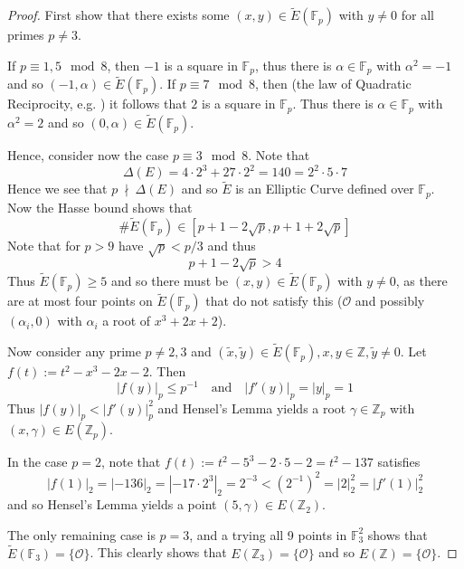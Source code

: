 \documentclass{scrartcl}
\newcommand{\Z}{\mathbb{Z}}
\newcommand{\F}{\mathbb{F}}
\renewcommand{\O}{\mathcal{O}}
\newcommand{\notdivides}{\ \nmid \ }
\theoremstyle{definition}
\begin{document}
\begin{proof}
    First show that there exists some $(x, y) \in \tilde{E}(\F_p)$ with $y \neq 0$ for all primes $p \neq 3$.

    If $p \equiv 1, 5 \mod 8$, then $-1$ is a square in $\F_p$, thus there is $\alpha \in \F_p$ with $\alpha^2 = -1$ and so $(-1, \alpha) \in \tilde{E}(\F_p)$.
    If $p \equiv 7 \mod 8$, then (the law of Quadratic Reciprocity, e.g. \cite[Prop. I.8.6]{neukirch}) it follows that $2$ is a square in $\F_p$.
    Thus there is $\alpha \in \F_p$ with $\alpha^2 = 2$ and so $(0, \alpha) \in \tilde{E}(\F_p)$.

    Hence, consider now the case $p \equiv 3 \mod 8$.
    Note that
    \begin{equation*}
        \Delta(E) = 4 \cdot 2^3 + 27 \cdot 2^2 = 140 = 2^2 \cdot 5 \cdot 7
    \end{equation*}
    Hence we see that $p \notdivides \Delta(E)$ and so $\tilde{E}$ is an Elliptic Curve defined over $\F_p$.
    Now the Hasse bound \cite[Thm 1.15]{lecture} shows that
    \begin{equation*}
        \#\tilde{E}(\F_p) \in [p + 1 - 2\sqrt{p}, p + 1 + 2\sqrt{p}]
    \end{equation*}
    Note that for $p > 9$ have $\sqrt{p} < p/3$ and thus
    \begin{equation*}
        p + 1 - 2\sqrt{p} > 4
    \end{equation*}
    Thus $\tilde{E}(\F_p) \geq 5$ and so there must be $(x, y) \in \tilde{E}(\F_p)$ with $y \neq 0$, as there are at most four points on $\tilde{E}(\F_p)$ that do not satisfy this ($\O$ and possibly $(\alpha_i, 0)$ with $\alpha_i$ a root of $x^3 + 2x + 2$).

    Now consider any prime $p \neq 2, 3$ and $(\tilde{x}, \tilde{y}) \in \tilde{E}(\F_p), x, y \in \Z, \tilde{y} \neq 0$.
    Let $f(t) := t^2 - x^3 - 2x - 2$.
    Then
    \begin{equation*}
        |f(y)|_p \leq p^{-1} \quad \text{and} \quad |f'(y)|_p = |y|_p = 1
    \end{equation*}
    Thus $|f(y)|_p < |f'(y)|_p^2$ and Hensel's Lemma yields a root $\gamma \in \Z_p$ with $(x, \gamma) \in E(\Z_p)$.

    In the case $p = 2$, note that $f(t) := t^2 - 5^3 - 2 \cdot 5 - 2 = t^2 - 137$ satisfies
    \begin{equation*}
        |f(1)|_2 = |-136|_2 = |-17 \cdot 2^3|_2 = 2^{-3} < \left( 2^{-1} \right)^2 = |2|_2^2 = |f'(1)|_2^2
    \end{equation*}
    and so Hensel's Lemma \cite[Thm 2.14]{lecture} yields a point $(5, \gamma) \in E(\Z_2)$.

    The only remaining case is $p = 3$, and a trying all 9 points in $\F_3^2$ shows that $\tilde{E}(\F_3) = \{\O\}$.
    This clearly shows that $E(\Z_3) = \{ \O \}$ and so $E(\Z) = \{\O\}$.
\end{proof}
\end{document}
